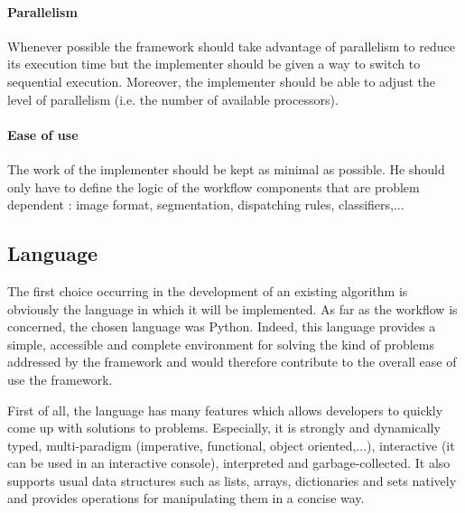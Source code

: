\paragraph{Parallelism} Whenever possible the framework should take advantage of parallelism to reduce its execution time but the implementer should be given a way to switch to sequential execution. Moreover, the implementer should be able to adjust the level of parallelism (i.e. the number of available processors).

\paragraph{Ease of use} The work of the implementer should be kept as minimal as possible. He should only have to define the logic of the workflow components that are problem dependent : image format, segmentation, dispatching rules, classifiers,... 

\subsection{Language}
\label{ssec:work_language}
The first choice occurring in the development of an existing algorithm is obviously the language in which it will be implemented. As far as the workflow is concerned, the chosen language was Python. Indeed, this language provides a simple, accessible and complete environment for solving the kind of problems addressed by the framework and would therefore contribute to the overall ease of use the framework. 

First of all, the language has many features which allows developers to quickly come up with solutions to problems. Especially, it is strongly and dynamically typed, multi-paradigm (imperative, functional, object oriented,...), interactive (it can be used in an interactive console), interpreted and garbage-collected. It also supports usual data structures such as lists, arrays, dictionaries and sets natively and provides operations for manipulating them in a concise way. 

